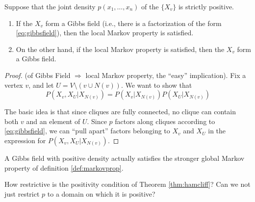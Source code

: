 \begin{theorem} \label{thm:hamcliff} Suppose that the joint density $p(x_1,\ldots,x_n)$ of the $\{X_v\}$ is strictly positive.
  
  \begin{enumerate}

  \item If the $X_v$ form a Gibbs field (i.e., there is a factorization of the form \eqref{eq:gibbsfield}), then the local Markov property is satisfied.
    
  \item On the other hand, if the local Markov property is satisfied, then the $X_v$ form a Gibbs field.
  \end{enumerate}
  
\end{theorem}

\begin{proof}
  (of Gibbs Field $\Rightarrow$ local Markov property, the ``easy'' implication). Fix a vertex $v$, and let $U = V \setminus (v \cup N(v))$.  We want to show that
  $$P(X_v, X_U | X_{N(v)}) = P(X_v | X_{N(v)})P(X_U | X_{N(v)})$$

  The basic idea is that since cliques are fully connected, no clique can contain both $v$ and an element of $U$. Since $p$ factors along cliques according to \eqref{eq:gibbsfield}, we can ``pull apart'' factors belonging to $X_v$ and $X_U$ in the expression for $P(X_v, X_U | X_{N(v)})$.
\end{proof}

\begin{remark} A Gibbs field with positive density actually satisfies the stronger global Markov property of definition \ref{def:markovprop}. 
\end{remark}

\begin{remark} How restrictive is the positivity condition of Theorem \ref{thm:hamcliff}? Can we not just restrict $p$ to a domain on which it is positive?
\end{remark}  



